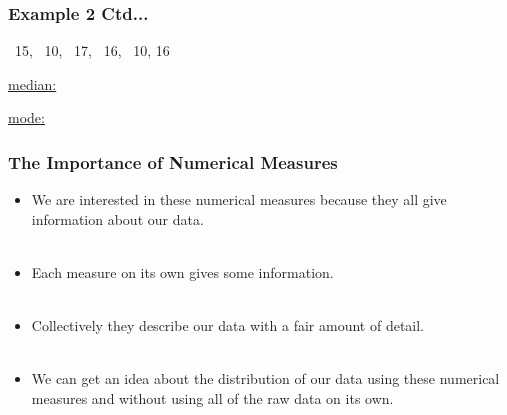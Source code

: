 \documentclass[xcolor=svgnames, compress]{beamer}
\begin{document}


\begin{frame}[t]

\frametitle{Example 2 Ctd...} 

\vspace{-0.50cm}

\begin{center}
~15, ~10, ~17, ~16, ~10, 16
\end{center}

\vspace{-0.5cm}
\underline{median:}

\vspace{4.5cm}

\underline{mode:}


\end{frame}








\begin{frame}
\frametitle{The Importance of Numerical Measures}

\begin{itemize}
\justifying
\item	We are interested in these numerical measures because they all give information about our data.\\
\hfill\\
\item	Each measure on its own gives some information.\\
\hfill\\
\item	Collectively they describe our data with a fair amount of detail.\\
\hfill\\
\item	We can get an idea about the \alert{distribution} of our data using these numerical measures and without using all of the raw data on its own.
\end{itemize}

\end{frame}
\end{document}
